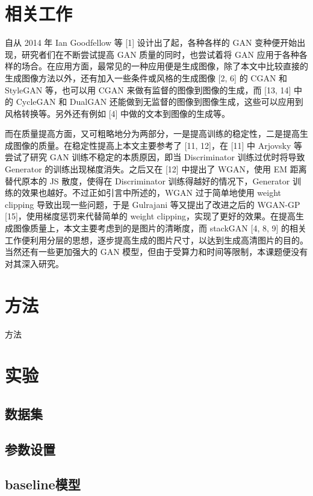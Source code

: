 \documentclass{article}
\begin{document}
\begin{CJK*}{UTF8}{gbsn}
\section{相关工作}

  自从 2014 年 Ian Goodfellow 等 [1] 设计出了起，各种各样的 GAN 变种便开始出现，研究者们在不断尝试提高 GAN 质量的同时，也尝试着将 GAN 应用于各种各样的场合。在应用方面，最常见的一种应用便是生成图像，除了本文中比较直接的生成图像方法以外，还有加入一些条件或风格的生成图像 [2, 6] 的 CGAN 和 StyleGAN 等，也可以用 CGAN 来做有监督的图像到图像的生成，而 [13, 14] 中的 CycleGAN 和 DualGAN 还能做到无监督的图像到图像生成，这些可以应用到风格转换等。另外还有例如 [4] 中做的文本到图像的生成等。

  而在质量提高方面，又可粗略地分为两部分，一是提高训练的稳定性，二是提高生成图像的质量。在稳定性提高上本文主要参考了 [11, 12]，在 [11] 中 Arjovsky 等尝试了研究 GAN 训练不稳定的本质原因，即当 Discriminator 训练过优时将导致 Generator 的训练出现梯度消失。之后又在 [12] 中提出了 WGAN，使用 EM 距离替代原本的 JS 散度，使得在 Discriminator 训练得越好的情况下，Generator 训练的效果也越好。不过正如引言中所述的，WGAN 过于简单地使用 weight clipping 导致出现一些问题，于是 Gulrajani 等又提出了改进之后的 WGAN-GP [15]，使用梯度惩罚来代替简单的 weight clipping，实现了更好的效果。在提高生成图像质量上，本文主要考虑到的是图片的清晰度，而 stackGAN [4, 8, 9] 的相关工作便利用分层的思想，逐步提高生成的图片尺寸，以达到生成高清图片的目的。当然还有一些更加强大的 GAN 模型，但由于受算力和时间等限制，本课题便没有对其深入研究。

\section{方法}

方法

\section{实验}

  \subsection{数据集}

  \subsection{参数设置}

  \subsection{baseline模型}


\end{CJK*}
\end{document}
